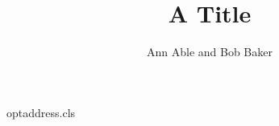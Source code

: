 \begin{filecontents*}[overwrite]{optaddress.cls}
\renewcommand\author[2][]{\gdef\@author{#2\ifx\relax#1\relax\else\textsuperscript{#1}\fi}}
\newcommand\address[2][]{\par{\small\ifx\relax#1\relax\else(#1) \fi #2}\par}
\def\inst#1{\textsuperscript{#1}}
\end{filecontents*}
\documentclass{optaddress}

\title{A Title}
\author{Ann Able and Bob Baker}
\address[\inst{1}]{Univ A, Town}
\address[\inst{2}]{Univ B, City}
\address[\inst{3}]{Lab C, Place}
\address[$^{4}$]{Lab D, Place}
\address[c, d]{Lab E, Place}
\maketitle
Body.

